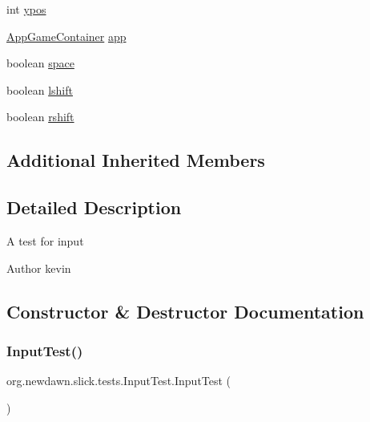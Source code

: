 \begin{DoxyCompactItemize}
int \mbox{\hyperlink{classorg_1_1newdawn_1_1slick_1_1tests_1_1_input_test_ad460e38695c9ef5b29ee97c5d88feac5}{ypos}}
\item 
\mbox{\hyperlink{classorg_1_1newdawn_1_1slick_1_1_app_game_container}{App\+Game\+Container}} \mbox{\hyperlink{classorg_1_1newdawn_1_1slick_1_1tests_1_1_input_test_a9f5c6e57ecc104f4baea82dcfc34106c}{app}}
\item 
boolean \mbox{\hyperlink{classorg_1_1newdawn_1_1slick_1_1tests_1_1_input_test_a1eecff134bda6848d619fe56fa8c9aae}{space}}
\item 
boolean \mbox{\hyperlink{classorg_1_1newdawn_1_1slick_1_1tests_1_1_input_test_a6fa7061e34b10500b50e91b61a42471c}{lshift}}
\item 
boolean \mbox{\hyperlink{classorg_1_1newdawn_1_1slick_1_1tests_1_1_input_test_a6711d640aa0bc08c7076cc521e7c3b49}{rshift}}
\end{DoxyCompactItemize}
\subsection*{Additional Inherited Members}


\subsection{Detailed Description}
A test for input

\begin{DoxyAuthor}{Author}
kevin 
\end{DoxyAuthor}


\subsection{Constructor \& Destructor Documentation}
\mbox{\label{classorg_1_1newdawn_1_1slick_1_1tests_1_1_input_test_a73386ef79c61414f910685a079722d32}} 
\subsubsection{\texorpdfstring{Input\+Test()}{InputTest()}}
{\footnotesize\ttfamily org.\+newdawn.\+slick.\+tests.\+Input\+Test.\+Input\+Test (\begin{DoxyParamCaption}{ }\end{DoxyParamCaption})\hspace{0.3cm}{\ttfamily [inline]}}

